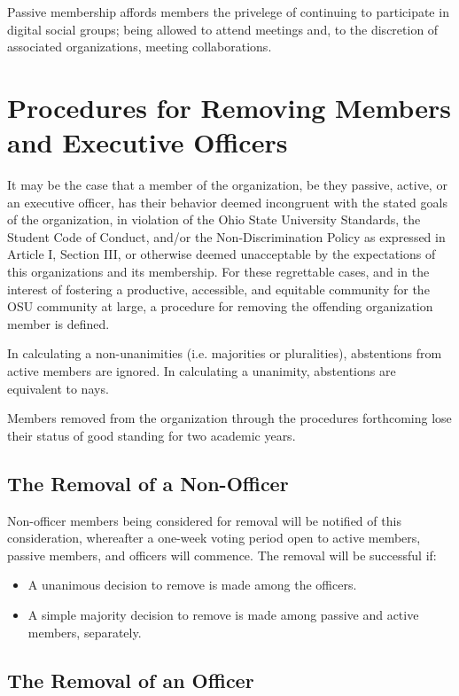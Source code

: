 \documentclass[12pt,letterpaper]{article}
\begin{document}
Passive membership affords members the privelege of continuing to participate in digital
social groups; being allowed to attend meetings and, to the discretion of associated
organizations, meeting collaborations.

\clearpage

\section{Procedures for Removing Members and Executive Officers}

It may be the case that a member of the organization, be they passive, active, or an
executive officer, has their behavior deemed incongruent with the stated goals of the
organization, in violation of the Ohio State University Standards, the Student Code of
Conduct, and/or the Non-Discrimination Policy as expressed in Article I, Section III, or
otherwise deemed unacceptable by the expectations of this organizations and its
membership. For these regrettable cases, and in the interest of fostering a productive,
accessible, and equitable community for the OSU community at large, a procedure for
removing the offending organization member is defined.

In calculating a non-unanimities (i.e. majorities or pluralities), abstentions from
active members are ignored. In calculating a unanimity, abstentions are equivalent to
nays.

Members removed from the organization through the procedures forthcoming lose their
status of good standing for two academic years.

\subsection{The Removal of a Non-Officer}

Non-officer members being considered for removal will be notified of this consideration,
whereafter a one-week voting period open to active members, passive members, and officers
will commence. The removal will be successful if:

\begin{itemize}
  \item A unanimous decision to remove is made among the officers.
  \item A simple majority decision to remove is made among passive and active members, separately.
\end{itemize}

\subsection{The Removal of an Officer}
\end{document}

